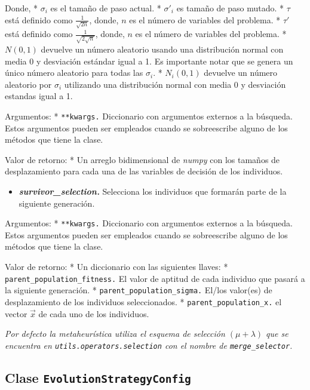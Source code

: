 \documentclass[11pt]{article}
\providecommand{\tightlist}{%
      \setlength{\itemsep}{0pt}\setlength{\parskip}{0pt}}
\begin{document}
Donde, * \(\sigma_{i}\) es el tamaño de paso actual. * \(\sigma'_{i}\)
es tamaño de paso mutado. * \(\tau\) está definido como
\(\frac{1}{\sqrt{2n}}\), donde, \(n\) es el número de variables del
problema. * \(\tau'\) está definido como \(\frac{1}{\sqrt{2\sqrt{n}}}\),
donde, \(n\) es el número de variables del problema. * \(N(0,1)\)
devuelve un número aleatorio usando una distribución normal con media 0
y desviación estándar igual a 1. Es importante notar que se genera un
único número aleatorio para todas las \(\sigma_{i}\). * \(N_{i}(0,1)\)
devuelve un número aleatorio por \(\sigma_i\) utilizando una
distribución normal con media 0 y desviación estandas igual a 1.

Argumentos: * \texttt{**kwargs.} Diccionario con argumentos externos a
la búsqueda. Estos argumentos pueden ser empleados cuando se
sobreescribe alguno de los métodos que tiene la clase.

Valor de retorno: * Un arreglo bidimensional de \emph{numpy} con los
tamaños de desplazamiento para cada una de las variables de decisión de
los individuos.

    \begin{itemize}
\tightlist
\item
  \emph{\textbf{survivor\_selection.}} Selecciona los individuos que
  formarán parte de la siguiente generación.
\end{itemize}

Argumentos: * \texttt{**kwargs.} Diccionario con argumentos externos a
la búsqueda. Estos argumentos pueden ser empleados cuando se
sobreescribe alguno de los métodos que tiene la clase.

Valor de retorno: * Un diccionario con las siguientes llaves: *
\texttt{parent\_population\_fitness.} El valor de aptitud de cada
individuo que pasará a la siguiente generación. *
\texttt{parent\_population\_sigma.} El/los valor(es) de desplazamiento
de los individuos seleccionados. * \texttt{parent\_population\_x.} el
vector \(\vec{x}\) de cada uno de los individuos.

\emph{Por defecto la metaheurística utiliza el esquema de selección
\((\mu + \lambda)\) que se encuentra en
\texttt{utils.operators.selection} con el nombre de
\texttt{merge\_selector}.}

    \subsection{\texorpdfstring{Clase
\texttt{EvolutionStrategyConfig}}{Clase EvolutionStrategyConfig}}\label{clase-evolutionstrategyconfig}
\end{document}
